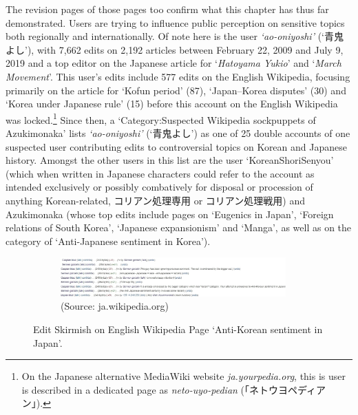 \documentclass[10pt,british,A4paper,oneside]{memoir}
\begin{document}
The revision pages of those pages too confirm what this chapter has thus
far demonstrated. Users are trying to influence public perception on
sensitive topics both regionally and internationally. Of note here is
the user \emph{`ao-oniyoshi'} (`青鬼よし'), with 7,662 edits on 2,192
articles between February 22, 2009 and July 9, 2019 and a top editor on
the Japanese article for `\emph{Hatoyama Yukio}' and `\emph{March
 Movement}'. This user's edits include 577 edits on the English
Wikipedia, focusing primarily on the article for `Kofun period' (87),
`Japan--Korea disputes' (30) and `Korea under Japanese rule' (15) before
this account on the English Wikipedia was locked.\footnote{On the
  Japanese alternative MediaWiki website \emph{ja.yourpedia.org}, this
  is user is described in a dedicated page as \emph{neto-uyo-pedian}
  (「ネトウヨペディアン」).} Since then, a `Category:Suspected Wikipedia
sockpuppets of Azukimonaka' lists \emph{`ao-oniyoshi'} (`青鬼よし') as
one of 25 double accounts of one suspected user contributing edits to
controversial topics on Korean and Japanese history. Amongst the other
users in this list are the user `KoreanShoriSenyou' (which when written
in Japanese characters could refer to the account as intended
exclusively or possibly combatively for disposal or procession of
anything Korean-related, コリアン処理専用 or コリアン処理戦用) and
Azukimonaka (whose top edits include pages on `Eugenics in Japan',
`Foreign relations of South Korea', `Japanese expansionism' and `Manga',
as well as on the category of `Anti-Japanese sentiment in Korea').

\begin{figure}[!htb]
 \centering
 \begin{subfigure}[b]{1\textwidth}
 \includegraphics[width=0.95\textwidth,trim=4 4 4 4,clip]{images/wiki/sennen-caspian2.jpg}
 \caption*{(Source: ja.wikipedia.org)}
 \end{subfigure}
 \caption{\label{fig:caspian} Edit Skirmish on English Wikipedia Page `Anti-Korean sentiment in Japan'.}
\end{figure}
\end{document}
